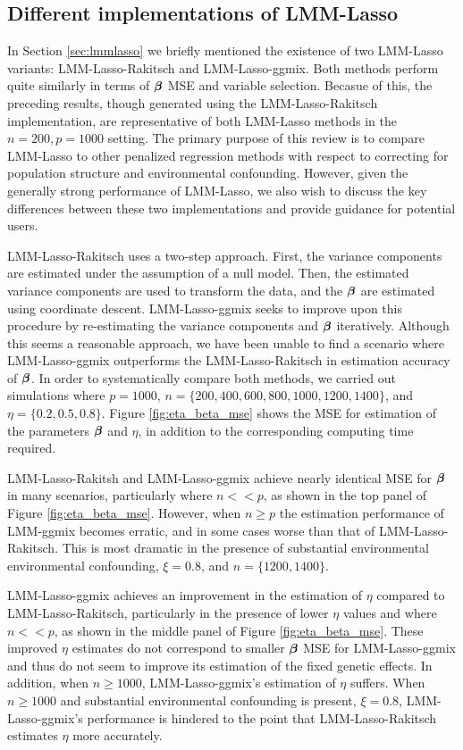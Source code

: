 \subsection{Different implementations of LMM-Lasso}

In Section \ref{sec:lmmlasso} we briefly mentioned the existence of two LMM-Lasso variants: LMM-Lasso-Rakitsch and LMM-Lasso-ggmix. Both methods perform quite similarly in terms of $\boldsymbol{\beta}{}$ MSE and variable selection. Becasue of this, the preceding results, though generated using the LMM-Lasso-Rakitsch implementation, are representative of both LMM-Lasso methods in the $n = 200, p = 1000$ setting. The primary purpose of this review is to compare LMM-Lasso to other penalized regression methods with respect to correcting for population structure and environmental confounding. However, given the generally strong performance of LMM-Lasso, we also wish to discuss the key differences between these two implementations and provide guidance for potential users.

LMM-Lasso-Rakitsch uses a two-step approach. First, the variance components are estimated under the assumption of a null model. Then, the estimated variance components are used to transform the data, and the $\boldsymbol{\beta}{}$ are estimated using coordinate descent. LMM-Lasso-ggmix seeks to improve upon this procedure by re-estimating the variance components and $\boldsymbol{\beta}{}$ iteratively. Although this seems a reasonable approach, we have been unable to find a scenario where LMM-Lasso-ggmix outperforms the LMM-Lasso-Rakitsch in estimation accuracy of $\boldsymbol{\beta}{}$. In order to systematically compare both methods, we carried out simulations where $p = 1000$, $n = \{200, 400, 600, 800, 1000, 1200, 1400\}$, and $\eta = \{0.2, 0.5, 0.8\}$. Figure \ref{fig:eta_beta_mse} shows the MSE for estimation of the parameters $\boldsymbol{\beta}{}$ and $\eta$, in addition to the corresponding computing time required. 

LMM-Lasso-Rakitsh and LMM-Lasso-ggmix achieve nearly identical MSE for $\boldsymbol{\beta}{}$ in many scenarios, particularly where $n << p$, as shown in the top panel of Figure \ref{fig:eta_beta_mse}. However, when $n \ge p$ the estimation performance of LMM-ggmix becomes erratic, and in some cases worse than that of LMM-Lasso-Rakitsch. This is most dramatic in the presence of substantial environmental environmental confounding, $\xi = 0.8$, and $n = \{1200, 1400\}$. 

LMM-Lasso-ggmix achieves an improvement in the estimation of $\eta$ compared to LMM-Lasso-Rakitsch, particularly in the presence of lower $\eta$ values and where $n << p$, as shown in the middle panel of Figure \ref{fig:eta_beta_mse}. These improved $\eta$ estimates do not correspond to smaller $\boldsymbol{\beta}{}$ MSE for LMM-Lasso-ggmix and thus do not seem to improve its estimation of the fixed genetic effects. In addition, when $n \ge 1000$, LMM-Lasso-ggmix's estimation of $\eta$ suffers. When $n \ge 1000$ and substantial environmental confounding is present, $\xi = 0.8$,  LMM-Lasso-ggmix's performance is hindered to the point that LMM-Lasso-Rakitsch estimates $\eta$ more accurately.

